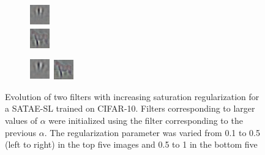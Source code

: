 \begin{figure}
\begin{subfigure}[b]{0.15\textwidth}
    \end{subfigure} \begin{subfigure}[b]{0.15\textwidth} \centering
    \includegraphics[scale=2]{./figures/SATAE/4.png} \\
    \includegraphics[scale=2]{./figures/SATAE/horse4.png} 
    \end{subfigure} \begin{subfigure}[b]{0.15\textwidth} \centering
    \includegraphics[scale=2]{./figures/SATAE/5.png} \includegraphics[scale=2]{./figures/SATAE/horse5.png}
    \\
		
    \end{subfigure} \caption{Evolution of two filters with increasing
    saturation regularization for a SATAE-SL trained on CIFAR-10. Filters
    corresponding to larger values of $\alpha$ were initialized using the
    filter corresponding to the previous $\alpha$. The regularization parameter
    was varied from 0.1 to 0.5 (left to right) in the top five images and 0.5
    to 1 in the bottom five } \label{fig:horse} \end{figure} 

